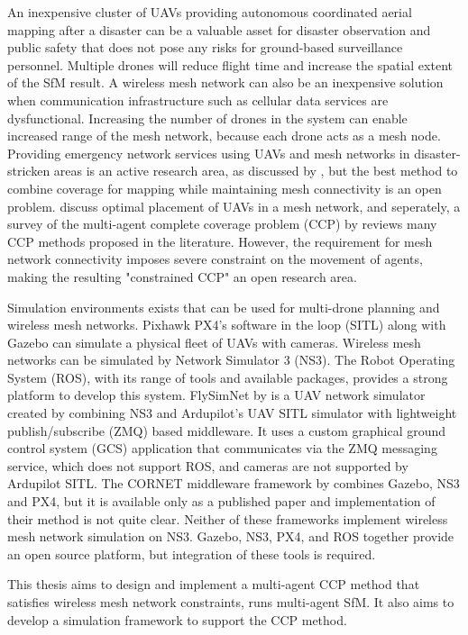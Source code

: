 An inexpensive cluster of UAVs providing autonomous coordinated aerial mapping after a disaster can be a valuable asset for disaster observation and public safety that does not pose any risks for ground-based surveillance personnel. Multiple drones will reduce flight time and increase the spatial extent of the SfM result. A wireless mesh network can also be an inexpensive solution when communication infrastructure such as cellular data services are dysfunctional. Increasing the number of drones in the system can enable increased range of the mesh network, because each drone acts as a mesh node. Providing emergency network services using UAVs and mesh networks in disaster-stricken areas is an active research area, as discussed by , but the best method to combine coverage for mapping while maintaining mesh connectivity is an open problem.  discuss optimal placement of UAVs in a mesh network, and seperately, a survey of the multi-agent complete coverage problem (CCP) by  reviews many CCP methods proposed in the literature. However, the requirement for mesh network connectivity imposes severe constraint on the movement of agents, making the resulting "constrained CCP" an open research area.

Simulation environments exists that can be used for multi-drone planning and wireless mesh networks. Pixhawk PX4's software in the loop (SITL) along with Gazebo can simulate a physical fleet of UAVs with cameras. Wireless mesh networks can be simulated by Network Simulator 3 (NS3). The Robot Operating System (ROS), with its range of tools and available packages, provides a strong platform to develop this system. FlySimNet by  is a UAV network simulator created by combining NS3 and Ardupilot's UAV SITL simulator with lightweight publish/subscribe (ZMQ) based middleware. It uses a custom graphical ground control system (GCS) application that communicates via the ZMQ messaging service, which does not support ROS, and cameras are not supported by Ardupilot SITL. The CORNET middleware framework by  combines Gazebo, NS3 and PX4, but it is available only as a published paper and implementation of their method is not quite clear. Neither of these frameworks implement wireless mesh network simulation on NS3. Gazebo, NS3, PX4, and ROS together provide an open source platform, but integration of these tools is required.

This thesis aims to design and implement a multi-agent CCP method that satisfies wireless mesh network constraints, runs multi-agent SfM. It also aims to develop a simulation framework to support the CCP method.

